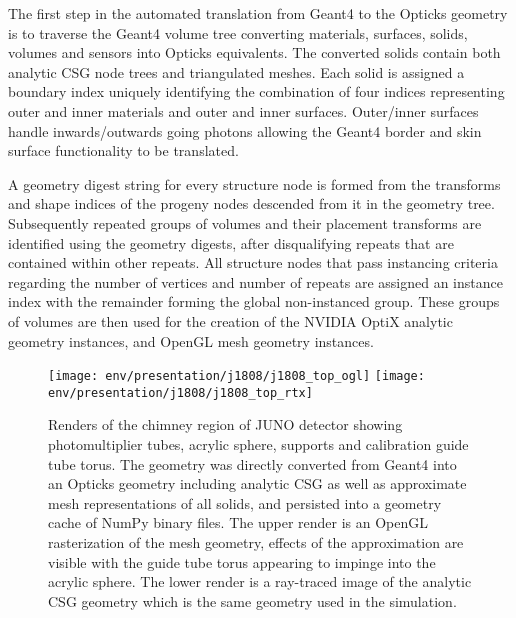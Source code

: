 \documentclass{webofc}
\newcommand{\comment}[1]{}
\begin{document}
The first step in the automated translation from Geant4 to the Opticks geometry is to traverse the Geant4 volume tree converting 
materials, surfaces, solids, volumes and sensors into Opticks equivalents. 
The converted solids contain both analytic CSG node trees and triangulated meshes.   
Each solid is assigned a boundary index uniquely identifying the combination of four indices representing 
outer and inner materials and outer and inner surfaces. Outer/inner surfaces handle inwards/outwards going photons allowing the Geant4 border and skin
surface functionality to be translated. 

A geometry digest string for every structure node is formed from the transforms and shape indices of the progeny nodes descended from it in the geometry tree. 
Subsequently repeated groups of volumes and their placement transforms are identified using the geometry digests, after disqualifying repeats
that are contained within other repeats. 
All structure nodes that pass instancing criteria regarding the number of vertices and number of repeats are assigned an instance index
with the remainder forming the global non-instanced group. 
These groups of volumes are then used for the creation of the NVIDIA OptiX analytic geometry instances, and OpenGL mesh geometry instances.  

\comment{
GPUs contain hardware dedicated to fast texture lookup and interpolation.
This is exploited by using a single 2D {\tt float4} texture named the boundary texture
that contains interleaved material and surface properties as a function of wavelength for all
unique boundaries.
The boundary index returned from a ray traced primitive intersection together with
an orientation offset identified from the angle between the geometric normal and ray direction
enables four wavelength interpolated material or surface properties to be
obtained from a single hardware optimized texture lookup.
}
%
%
\begin{figure}
\centering
\texttt{[image: env/presentation/j1808/j1808\_top\_ogl]}
\texttt{[image: env/presentation/j1808/j1808\_top\_rtx]}
\caption{Renders of the chimney region of JUNO detector showing photomultiplier tubes, acrylic sphere, supports and calibration guide tube torus. 
The geometry was directly converted from Geant4 into an Opticks geometry including analytic CSG as well as approximate mesh representations of all solids, 
and persisted into a geometry cache of NumPy\cite{numpy} binary files. 
The upper render is an OpenGL rasterization of the mesh geometry, effects of the approximation are visible with the guide tube torus appearing to impinge into
the acrylic sphere. The lower render is a ray-traced image of the analytic CSG geometry which is the 
same geometry used in the simulation.}
\label{j1808} 
\end{figure}
%
%
\end{document}

